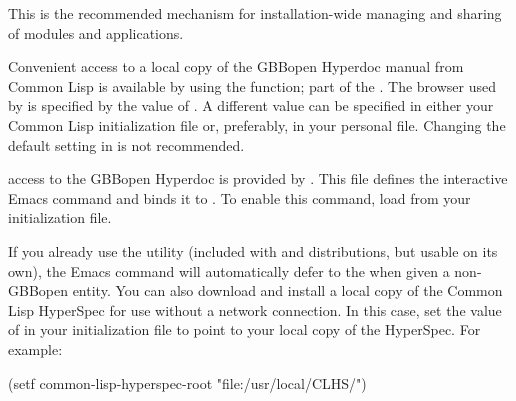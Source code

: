 \documentclass[10pt,twoside,english,pdftex]{article}
\begin{document}
This is the recommended mechanism for installation-wide managing and sharing
of modules and applications.

\label{sec:hyperdoc}
%
%
%
%
%
%
%
%
%
%
%

Convenient access to a local copy of the GBBopen Hyperdoc manual from Common
Lisp is available by using the \textbf{} function;
part of the 
. The browser used by \textbf{} is
specified by the value of .  A different
value can be specified in either your Common Lisp initialization file or,
preferably, in your personal  file.  Changing the
default setting in  is not recommended.

 access to the
GBBopen Hyperdoc is provided by
.  This file defines the
interactive Emacs command  and binds it to
.  To enable this command, load
 from your 
initialization file.

If you already use the
utility (included with
 and
 distributions, but
usable on its own), the Emacs  command will
automatically defer to the  when given a
non-GBBopen entity.  You can also download and install a local copy of the
Common Lisp HyperSpec for use without a network connection.  In this case, set
the value of  in your 
initialization file to point to your local copy of the HyperSpec.  For
example:
%
\W\supp
\begin{example}
  (setf common-lisp-hyperspec-root "file:/usr/local/CLHS/")
\end{example}
\end{document}
